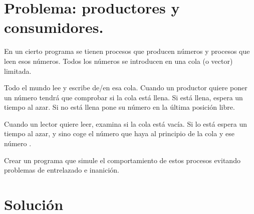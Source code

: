 \documentclass[letterpaper,10pt,spanish]{sphinxmanual}
\begin{document}
\section{Problema: productores y consumidores.}
\label{\detokenize{textos/tema2:problema-productores-y-consumidores}}
En un cierto programa se tienen procesos que producen números y procesos que leen esos números. Todos los números se introducen en una cola (o vector) limitada.

Todo el mundo lee y escribe de/en esa cola. Cuando un productor quiere poner un número tendrá que comprobar si la cola está llena. Si está llena, espera un tiempo al azar. Si no está llena pone su número en la última posición libre.

Cuando un lector quiere leer, examina si la cola está vacía. Si lo está espera un tiempo al azar, y sino coge el número que haya al principio de la cola y ese número .

Crear un programa que simule el comportamiento de estos procesos evitando problemas de entrelazado e inanición.


\section{Solución}
\label{\detokenize{textos/tema2:solucion}}
\end{document}

